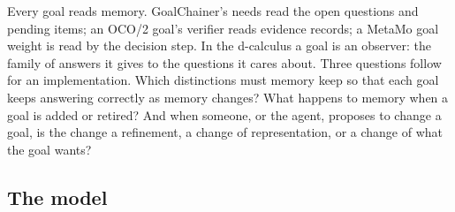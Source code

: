 \documentclass[11pt]{article}
\theoremstyle{definition}
\theoremstyle{plain}
\begin{document}
Every goal reads memory. GoalChainer's needs read the open questions and pending items; an OCO/2
goal's verifier reads evidence records; a MetaMo goal weight is read by the decision step. In the
d-calculus a goal is an observer: the family of answers it gives to the questions it cares about.
Three questions follow for an implementation. Which distinctions must memory keep so that each goal
keeps answering correctly as memory changes? What happens to memory when a goal is added or
retired? And when someone, or the agent, proposes to change a goal, is the change a refinement, a
change of representation, or a change of what the goal wants?

\subsection{The model}
\end{document}
